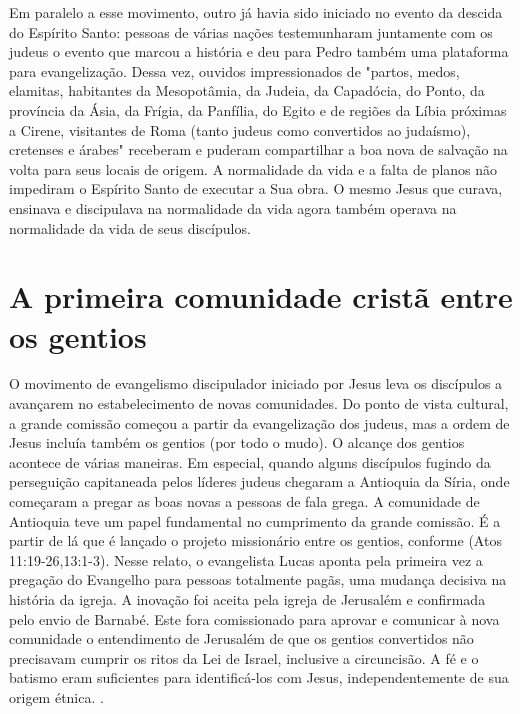 \documentclass[
	12pt,				%
	openright,			%
	twoside,			%
	a4paper,			%
	english,			%
	french,				%
	spanish,			%
	brazil				%
	]{abntex2}
\begin{document}
Em paralelo a esse movimento, outro já havia sido iniciado no evento da descida do Espírito Santo: pessoas de várias nações testemunharam juntamente com os judeus o evento que marcou a história e deu para Pedro também uma plataforma para evangelização. Dessa vez, ouvidos impressionados de "partos, medos, elamitas, habitantes da Mesopotâmia, da Judeia, da Capadócia, do Ponto, da província da Ásia, da Frígia, da Panfília, do Egito e de regiões da Líbia próximas a Cirene, visitantes de Roma (tanto judeus como convertidos ao judaísmo), cretenses e árabes" receberam e puderam compartilhar a boa nova de salvação na volta para seus locais de origem. A normalidade da vida e a falta de planos não impediram o Espírito Santo de executar a Sua obra. O mesmo Jesus que curava, ensinava e discipulava na normalidade da vida agora também operava na normalidade da vida de seus discípulos.

\section{A primeira comunidade cristã entre os gentios}

O movimento de evangelismo discipulador iniciado por Jesus leva os discípulos a avançarem no estabelecimento de novas comunidades. Do ponto de vista cultural, a grande comissão começou a partir da evangelização dos judeus, mas a ordem de Jesus incluía também os gentios (por todo o mudo). O alcançe dos gentios acontece de várias maneiras. Em especial, quando alguns discípulos fugindo da perseguição capitaneada pelos líderes judeus chegaram a Antioquia da Síria, onde começaram a pregar as boas novas a pessoas de fala grega. A comunidade de Antioquia teve um papel fundamental no cumprimento da grande comissão. É a partir de lá que é lançado o projeto missionário entre os gentios, conforme (Atos 11:19-26,13:1-3). Nesse relato, o evangelista Lucas aponta pela primeira vez a pregação do Evangelho para pessoas totalmente pagãs, uma mudança decisiva na história da igreja. A inovação foi aceita pela igreja de Jerusalém e confirmada pelo envio de Barnabé. Este fora comissionado para aprovar e comunicar à nova comunidade o entendimento de Jerusalém de que os gentios convertidos não precisavam cumprir os ritos da Lei de Israel, inclusive a circuncisão. A fé e o batismo eram suficientes para identificá-los com Jesus, independentemente de sua origem étnica. \cite[198]{green}.
\end{document}
